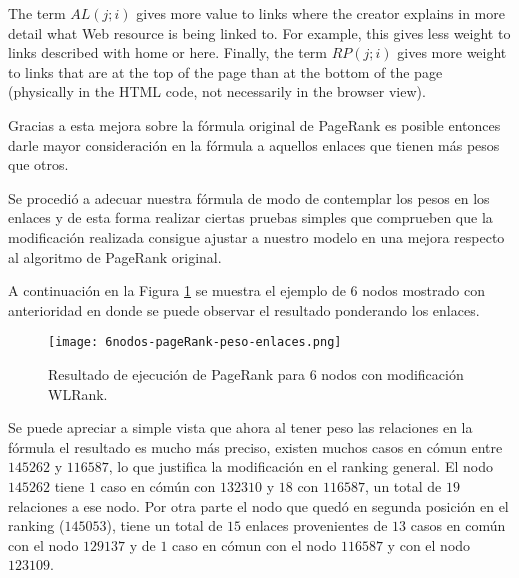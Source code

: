 
The term $AL(j;i)$ gives more value to links where the creator explains in more detail what Web resource is being linked to. For example, this gives less weight to links described with home or here. Finally, the term $RP(j; i)$ gives more weight to links that are at the top of the page than at the bottom of the page (physically in the HTML code, not necessarily in the browser view).

Gracias a esta mejora sobre la fórmula original de PageRank es posible entonces darle mayor consideración en la fórmula a aquellos enlaces que tienen más pesos que otros.

Se procedió a adecuar nuestra fórmula de modo de contemplar los pesos en los enlaces y de esta forma realizar ciertas pruebas simples que comprueben que la modificación realizada consigue ajustar a nuestro modelo en una mejora respecto al algoritmo de PageRank original.

A continuación en la Figura \ref{fig:6nodos-pageRank-peso-enlaces} se muestra el ejemplo de 6 nodos mostrado con anterioridad en donde se puede observar el resultado ponderando los enlaces.

\begin{figure}
	\centering
	\texttt{[image: 6nodos-pageRank-peso-enlaces.png]}
	\caption{Resultado de ejecución de PageRank para 6 nodos con modificación WLRank.} 
	\label{fig:6nodos-pageRank-peso-enlaces}
\end{figure}

Se puede apreciar a simple vista que ahora al tener peso las relaciones en la fórmula el resultado es mucho más preciso, existen muchos casos en cómun entre $145262$ y $116587$, lo que justifica la modificación en el ranking general. El nodo $145262$ tiene $1$ caso en cómún con $132310$ y $18$ con $116587$, un total de $19$ relaciones a ese nodo. Por otra parte el nodo que quedó en segunda posición en el ranking ($145053$), tiene un total de $15$ enlaces provenientes de $13$ casos en común con el nodo $129137$ y de $1$ caso en cómun con el nodo $116587$ y con el nodo $123109$.

